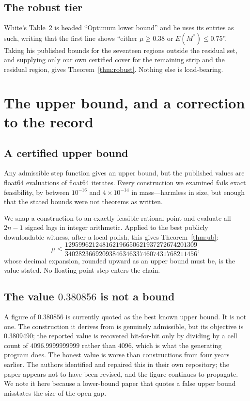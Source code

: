 \documentclass[11pt]{article}
\theoremstyle{definition}
\begin{document}
\subsection{The robust tier}

White's Table~2 is headed ``Optimum lower bound'' and he uses its entries
as such, writing that the first line shows ``either $\mu \ge 0.38$ or
$E(M^*) \le 0.75$''. Taking his published bounds for the seventeen
regions outside the residual set, and supplying only our own certified
cover for the remaining strip and the residual region, gives
Theorem~\ref{thm:robust}. Nothing else is load-bearing.

\section{The upper bound, and a correction to the record}\label{sec:ub}

\subsection{A certified upper bound}

Any admissible step function gives an upper bound, but the published
values are float64 evaluations of float64 iterates. Every construction we
examined fails exact feasibility, by between $10^{-16}$ and
$4\times10^{-14}$ in mass---harmless in size, but enough that the stated
bounds were not theorems as written.

We snap a construction to an exactly feasible rational point and evaluate
all $2n-1$ signed lags in integer arithmetic. Applied to the best
publicly downloadable witness, after a local polish, this gives
Theorem~\ref{thm:ub}:
\[
  \mu \le \frac{129599621248162196650621937272674201309}
               {340282366920938463463374607431768211456},
\]
whose decimal expansion, rounded upward as an upper bound must be, is the
value stated. No floating-point step enters the chain.

\subsection{The value \texorpdfstring{$0.380856$}{0.380856} is not a bound}

A figure of $0.380856$ is currently quoted as the best known upper bound.
It is not one. The construction it derives from is genuinely admissible,
but its objective is $0.3809490$; the reported value is recovered
bit-for-bit only by dividing by a cell count of $4096.9999999999$ rather
than $4096$, which is what the generating program does. The honest value
is worse than constructions from four years earlier. The authors
identified and repaired this in their own repository; the paper appears
not to have been revised, and the figure continues to propagate. We note
it here because a lower-bound paper that quotes a false upper bound
misstates the size of the open gap.
\end{document}
